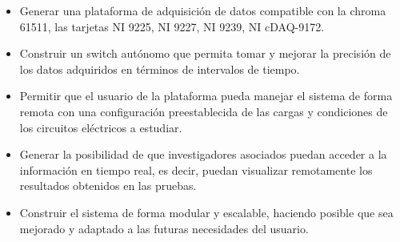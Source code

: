 \begin{itemize}

\item Generar una plataforma de adquisición de datos compatible con la chroma 61511, las tarjetas NI 9225, NI 9227, NI 9239, NI cDAQ-9172.   

\item Construir un switch autónomo que permita tomar y  mejorar la precisión de los datos adquiridos en términos de intervalos de tiempo. 
\item Permitir que el usuario de la plataforma pueda manejar el sistema de forma remota con una configuración preestablecida de las cargas y condiciones de los circuitos eléctricos a estudiar.

\item Generar la posibilidad de que investigadores asociados puedan acceder a la información en tiempo real, es decir, puedan visualizar remotamente los resultados obtenidos en las pruebas.

\item Construir el sistema de forma modular y escalable, haciendo posible que sea mejorado y adaptado a las futuras necesidades del usuario. 

\end{itemize}








